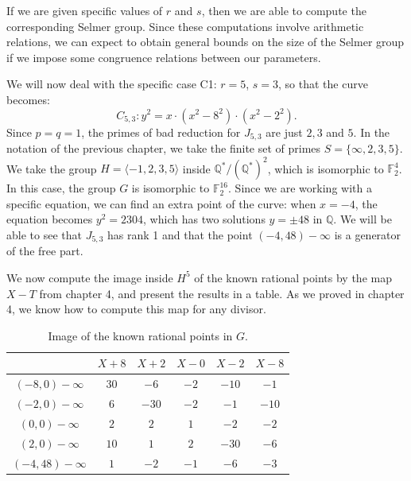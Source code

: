 \documentclass[a4paper, 12pt]{amsart}
\theoremstyle{definition}
\theoremstyle{plain}
\theoremstyle{plain}
\theoremstyle{plain}
\theoremstyle{plain}
\theoremstyle{remark}
\theoremstyle{remark}
\theoremstyle{plain}
\newcommand{\Q}{\mathbb{Q}}
\newcommand{\GF}[1]{\mathbb{F}_{#1}}
\begin{document}
	If we are given specific values of $r$ and $s$, then we are able to compute the corresponding Selmer group. Since these computations involve arithmetic relations, we can expect to obtain general bounds on the size of the Selmer group if we impose some congruence relations between our parameters.
	
	We will now deal with the specific case C1: $r=5$, $s=3$, so that the curve becomes:
	\begin{equation*}
		C_{5,3}: y^2=x\cdot(x^2-8^2)\cdot(x^2-2^2).
	\end{equation*}
	Since $p=q=1$, the primes of bad reduction for $J_{5,3}$ are just $2,3$ and $5$. In the notation of the previous chapter, we take the finite set of primes $S=\{\infty,2,3,5\}$. We take the group $H=\langle -1,2,3,5\rangle$ inside $\Q^*/(\Q^*)^2$, which is isomorphic to $\GF2^4$. In this case, the group $G$ is isomorphic to $\GF{2}^{16}$. Since we are working with a specific equation, we can find an extra point of the curve: when $x=-4$, the equation becomes $y^2=2304$, which has two solutions $y=\pm 48$ in $\Q$. We will be able to see that $J_{5,3}$ has rank 1 and that the point $(-4,48)-\infty$ is a generator of the free part.
	
	We now compute the image inside $H^5$ of the known rational points by the map $X-T$ from chapter 4, and present the results in a table. As we proved in chapter 4, we know how to compute this map for any divisor.
	
	\begin{table}[h!]
		\begin{center}
		\begin{tabular}{c|c|c|c|c|c}
			 & $X+8$ & $X+2$ & $X-0$ & $X-2$ & $X-8$\\ \hline
			$(-8,0)-\infty$&$30$ & $-6$ & $-2$ & $-10$ & $-1$\\ \hline
			$(-2,0)-\infty$&$6$ & $-30$ & $-2$ & $-1$ & $-10$\\ \hline
			$(0,0)-\infty$&$2$ & $2$ & $1$ & $-2$ & $-2$\\ \hline
			$(2,0)-\infty$&$10$ & $1$ & $2$ & $-30$ & $-6$\\ \hline
			$(-4,48)-\infty$&$1$ & $-2$ & $-1$ & $-6$ & $-3$
		\end{tabular}
		\vspace{10pt}
		\caption{Image of the known rational points in $G$.}
		\end{center}
		\end{table}
	
\end{document}
